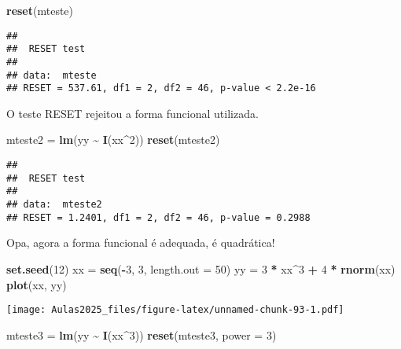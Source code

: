 \documentclass[
]{book}
\newenvironment{Shaded}{\begin{snugshade}}{\end{snugshade}}
\newcommand{\AttributeTok}[1]{\textcolor[rgb]{0.13,0.29,0.53}{#1}}
\newcommand{\DecValTok}[1]{\textcolor[rgb]{0.00,0.00,0.81}{#1}}
\newcommand{\FunctionTok}[1]{\textcolor[rgb]{0.13,0.29,0.53}{\textbf{#1}}}
\newcommand{\NormalTok}[1]{#1}
\newcommand{\OtherTok}[1]{\textcolor[rgb]{0.56,0.35,0.01}{#1}}
\newcommand{\SpecialCharTok}[1]{\textcolor[rgb]{0.81,0.36,0.00}{\textbf{#1}}}
\begin{document}
\begin{Shaded}
\begin{Highlighting}[]
\FunctionTok{reset}\NormalTok{(mteste)}
\end{Highlighting}
\end{Shaded}

\begin{verbatim}
## 
##  RESET test
## 
## data:  mteste
## RESET = 537.61, df1 = 2, df2 = 46, p-value < 2.2e-16
\end{verbatim}

O teste RESET rejeitou a forma funcional utilizada.

\begin{Shaded}
\begin{Highlighting}[]
\NormalTok{mteste2 }\OtherTok{=} \FunctionTok{lm}\NormalTok{(yy }\SpecialCharTok{\textasciitilde{}} \FunctionTok{I}\NormalTok{(xx}\SpecialCharTok{\^{}}\DecValTok{2}\NormalTok{))}
\FunctionTok{reset}\NormalTok{(mteste2)}
\end{Highlighting}
\end{Shaded}

\begin{verbatim}
## 
##  RESET test
## 
## data:  mteste2
## RESET = 1.2401, df1 = 2, df2 = 46, p-value = 0.2988
\end{verbatim}

Opa, agora a forma funcional é adequada, é quadrática!

\begin{Shaded}
\begin{Highlighting}[]
\FunctionTok{set.seed}\NormalTok{(}\DecValTok{12}\NormalTok{)}
\NormalTok{xx }\OtherTok{=} \FunctionTok{seq}\NormalTok{(}\SpecialCharTok{{-}}\DecValTok{3}\NormalTok{, }\DecValTok{3}\NormalTok{, }\AttributeTok{length.out =} \DecValTok{50}\NormalTok{)}
\NormalTok{yy }\OtherTok{=} \DecValTok{3} \SpecialCharTok{*}\NormalTok{ xx}\SpecialCharTok{\^{}}\DecValTok{3} \SpecialCharTok{+} \DecValTok{4} \SpecialCharTok{*} \FunctionTok{rnorm}\NormalTok{(xx)}
\FunctionTok{plot}\NormalTok{(xx, yy)}
\end{Highlighting}
\end{Shaded}

\texttt{[image: Aulas2025\_files/figure-latex/unnamed-chunk-93-1.pdf]}

\begin{Shaded}
\begin{Highlighting}[]
\NormalTok{mteste3 }\OtherTok{=} \FunctionTok{lm}\NormalTok{(yy }\SpecialCharTok{\textasciitilde{}} \FunctionTok{I}\NormalTok{(xx}\SpecialCharTok{\^{}}\DecValTok{3}\NormalTok{))}
\FunctionTok{reset}\NormalTok{(mteste3, }\AttributeTok{power =} \DecValTok{3}\NormalTok{)}
\end{Highlighting}
\end{Shaded}
\end{document}
